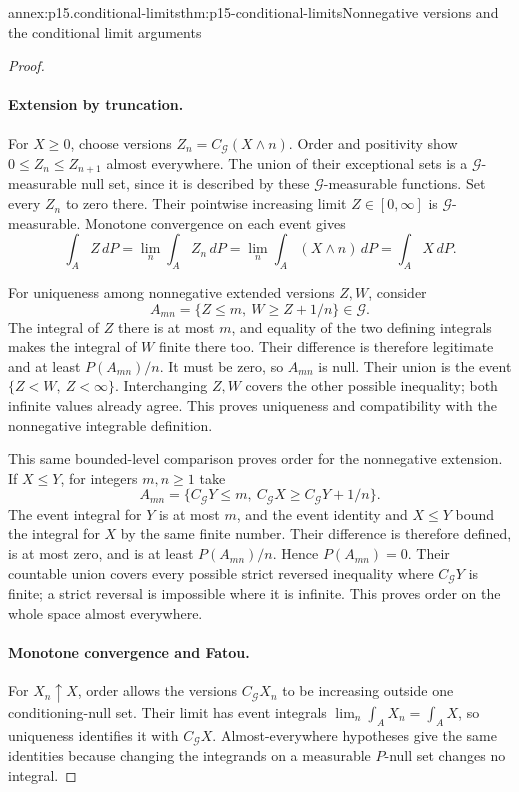 \begin{annexitem}{annex:p15.conditional-limits}{thm:p15-conditional-limits}{Nonnegative versions and the conditional limit arguments}
\begin{proof}
\paragraph{Extension by truncation.}
For \(X\geq0\), choose versions \(Z_n=C_{\mathcal G}(X\wedge n)\).
Order and positivity show \(0\leq Z_n\leq Z_{n+1}\) almost everywhere.
The union of their exceptional sets is a \(\mathcal G\)-measurable
null set, since it is described by these \(\mathcal G\)-measurable
functions. Set every \(Z_n\) to zero there.
Their pointwise increasing limit \(Z\in[0,\infty]\) is
\(\mathcal G\)-measurable. Monotone convergence on each event gives
\[
                   \int_AZ\,dP
                     =\lim_n\int_AZ_n\,dP
                     =\lim_n\int_A(X\wedge n)\,dP
                     =\int_AX\,dP.
\]

For uniqueness among nonnegative extended versions \(Z,W\), consider
\[
                  A_{mn}=\{Z\leq m,\ W\geq Z+1/n\}\in\mathcal G.
\]
The integral of \(Z\) there is at most \(m\), and equality of the
two defining integrals makes the integral of \(W\) finite there too.
Their difference is therefore legitimate and at least \(P(A_{mn})/n\).
It must be zero, so \(A_{mn}\) is null.
Their union is the event \(\{Z<W,\ Z<\infty\}\).
Interchanging \(Z,W\) covers the other possible inequality; both
infinite values already agree. This proves uniqueness and compatibility
with the nonnegative integrable definition.

This same bounded-level comparison proves order for the nonnegative
extension. If \(X\leq Y\), for integers \(m,n\geq1\) take
\[
 A_{mn}=\{C_{\mathcal G}Y\leq m,\
             C_{\mathcal G}X\geq C_{\mathcal G}Y+1/n\}.
\]
The event integral for \(Y\) is at most \(m\), and the event identity
and \(X\leq Y\) bound the integral for \(X\) by the same finite number.
Their difference is therefore defined, is at most zero, and is at
least \(P(A_{mn})/n\). Hence \(P(A_{mn})=0\).
Their countable union covers every possible strict reversed inequality
where \(C_{\mathcal G}Y\) is finite; a strict reversal is impossible
where it is infinite. This proves order on the whole space almost everywhere.

\paragraph{Monotone convergence and Fatou.}
For \(X_n\uparrow X\), order allows the versions \(C_{\mathcal G}X_n\)
to be increasing outside one conditioning-null set.
Their limit has event integrals \(\lim_n\int_AX_n=\int_AX\),
so uniqueness identifies it with \(C_{\mathcal G}X\).
Almost-everywhere hypotheses give the same identities because changing
the integrands on a measurable \(P\)-null set changes no integral.


\end{proof}
\end{annexitem}
